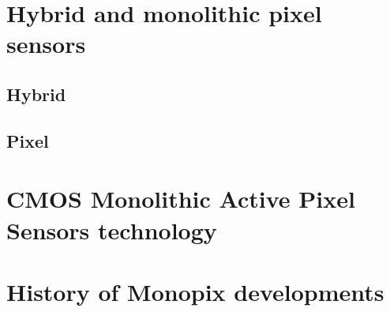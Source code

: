 \section{Hybrid and monolithic pixel sensors}

\subsection{Hybrid}

\subsection{Pixel}


\section{CMOS Monolithic Active Pixel Sensors technology}


\begin{comment}
small fill factor /large fill factor
\end{comment}

\section{History of Monopix developments}





























































